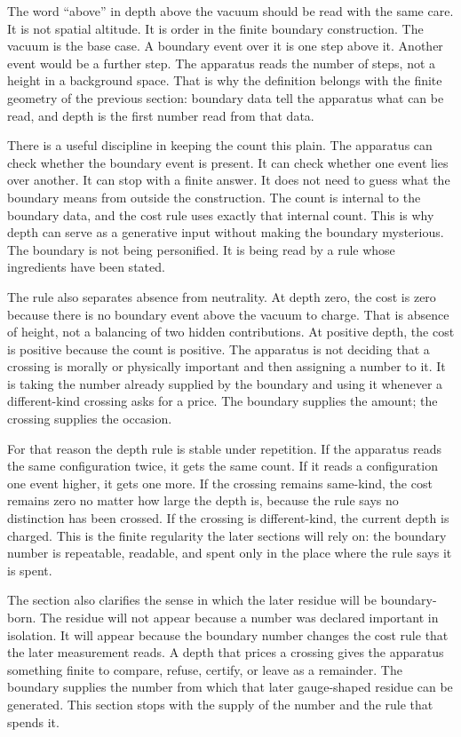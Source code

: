 The word ``above'' in depth above the vacuum should be read with the same care. It is
not spatial altitude. It is order in the finite boundary construction. The vacuum is
the base case. A boundary event over it is one step above it. Another event would be a
further step. The apparatus reads the number of steps, not a height in a background
space. That is why the definition belongs with the finite geometry of the previous
section: boundary data tell the apparatus what can be read, and depth is the first
number read from that data.

There is a useful discipline in keeping the count this plain. The apparatus can check
whether the boundary event is present. It can check whether one event lies over
another. It can stop with a finite answer. It does not need to guess what the boundary
means from outside the construction. The count is internal to the boundary data, and
the cost rule uses exactly that internal count. This is why depth can serve as a
generative input without making the boundary mysterious. The boundary is not being
personified. It is being read by a rule whose ingredients have been stated.

The rule also separates absence from neutrality. At depth zero, the cost is zero
because there is no boundary event above the vacuum to charge. That is absence of
height, not a balancing of two hidden contributions. At positive depth, the cost is
positive because the count is positive. The apparatus is not deciding that a crossing
is morally or physically important and then assigning a number to it. It is taking the
number already supplied by the boundary and using it whenever a different-kind
crossing asks for a price. The boundary supplies the amount; the crossing supplies the
occasion.

For that reason the depth rule is stable under repetition. If the apparatus reads the
same configuration twice, it gets the same count. If it reads a configuration one
event higher, it gets one more. If the crossing remains same-kind, the cost remains
zero no matter how large the depth is, because the rule says no distinction has been
crossed. If the crossing is different-kind, the current depth is charged. This is the
finite regularity the later sections will rely on: the boundary number is repeatable,
readable, and spent only in the place where the rule says it is spent.

The section also clarifies the sense in which the later residue will be boundary-born.
The residue will not appear because a number was declared important in isolation. It
will appear because the boundary number changes the cost rule that the later
measurement reads. A depth that prices a crossing gives the apparatus something finite
to compare, refuse, certify, or leave as a remainder. The boundary supplies the
number from which that later gauge-shaped residue can be generated. This section stops
with the supply of the number and the rule that spends it.

